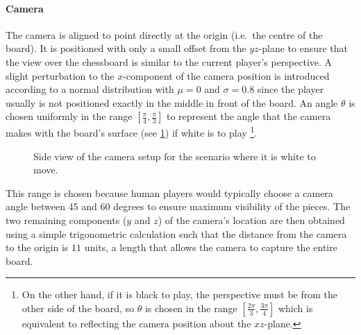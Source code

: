 \documentclass[../report.tex]{subfiles}
\begin{document}
\paragraph{Camera}
The camera is aligned to point directly at the origin (i.e.\ the centre of the board).
It is positioned with only a small offset from the $yz$-plane to ensure that the view over the chessboard is similar to the current player's perspective. 
A slight perturbation to the $x$-component of the camera position is introduced according to a normal distribution with $\mu=0$ and $\sigma=0.8$ since the player usually is not positioned exactly in the middle in front of the board.
An angle $\theta$ is chosen uniformly in the range $\left[\frac{\pi}{4},\frac{\pi}{3}\right]$ to represent the angle that the camera makes with the board's surface (see \cref{fig:camera_angle}) if white is to play%
\footnote{On the other hand, if it is black to play, the perspective must be from the other side of the board, so $\theta$ is chosen in the range $\left[\frac{2\pi}{3},\frac{3\pi}{4}\right]$ which is equivalent to reflecting the camera position about the $xz$-plane.}.
\begin{figure}
    \centering
    \caption{Side view of the camera setup for the scenario where it is white to move. }
    \label{fig:camera_angle}
\end{figure}
This range is chosen because human players would typically choose a camera angle between 45 and 60 degrees to ensure maximum visibility of the pieces.
The two remaining components ($y$ and $z$) of the camera's location are then obtained using a simple trigonometric calculation such that the distance from the camera to the origin is $11$ units, a length that allows the camera to capture the entire board.
\end{document}
